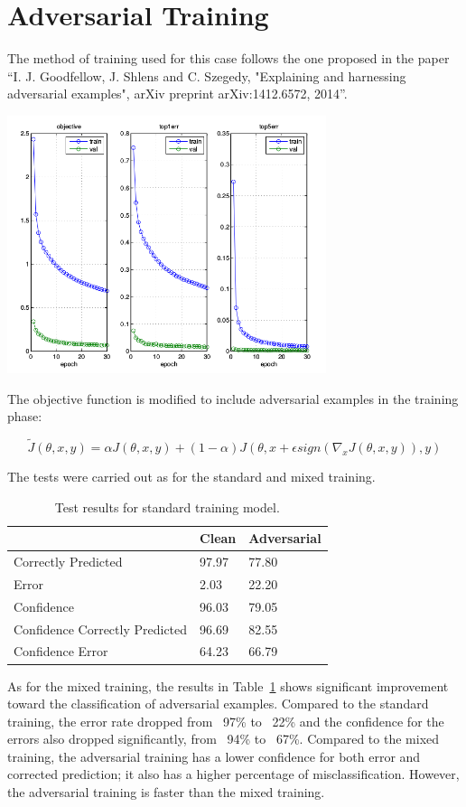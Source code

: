 \section{Adversarial Training}

The method of training used for this case follows the one proposed in the paper “I. J. Goodfellow, J. Shlens and C. Szegedy, "Explaining and harnessing adversarial examples", arXiv preprint arXiv:1412.6572, 2014”.

\begin{center}
  \includegraphics[width=0.7\textwidth]{img/train-adv.png}
	\label{train-mix} 
\end{center}

The objective function is modified to include adversarial examples in the training phase:

$$ 	\tilde{J}(\theta, x, y) = \alpha J(\theta, x, y) + ( 1 - \alpha)J(\theta, x + \epsilon sign(\nabla_{x}J(\theta, x, y)), y) $$

The tests were carried out as for the standard and mixed training.

\FloatBarrier
\begin{table}[h]
\centering
\begin{tabular}{@{}lll@{}}
\toprule
                               & Clean & Adversarial \\ \midrule
Correctly Predicted            & 97.97 & 77.80       \\
Error                          & 2.03  & 22.20       \\
Confidence                     & 96.03 & 79.05       \\
Confidence Correctly Predicted & 96.69 & 82.55       \\
Confidence Error               & 64.23 & 66.79       \\ \bottomrule
\end{tabular}
\caption{Test results for standard training model.}
\label{adv-test}
\end{table}
\FloatBarrier

As for the mixed training, the results in Table~\ref{adv-test} shows significant improvement toward the classification of adversarial examples. Compared to the standard training, the error rate dropped from ~97\% to ~22\% and the confidence for the errors also dropped significantly, from ~94\% to ~67\%.
Compared to the mixed training, the adversarial training has a lower confidence for both error and corrected prediction; it also has a higher percentage of misclassification. However, the adversarial training is faster than the mixed training.
